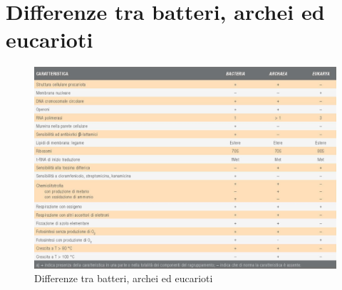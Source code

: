 \section{Differenze tra batteri, archei ed eucarioti}
\begin{figure}[H]
\includegraphics[scale = 0.3]{Pictures/DiffBatArcEu.png}
\caption{Differenze tra batteri, archei ed eucarioti}
\end{figure}
\newpage
